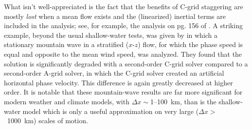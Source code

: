 \documentclass[10pt,letterpaper,margin=1in]{memoir}
\begin{document}
What isn't well-appreciated is the fact that the benefits of C-grid staggering are mostly \textit{lost} when a mean flow exists and the (linearized) inertial terms are included in the analysis; see, for example, the analysis on pg. 156 of \citet{durran2010numerical}. A striking example, beyond the usual shallow-water tests, was given by \citet{Reinecke2009} in which a stationary mountain wave in a stratified ($x$-$z$) flow, for which the phase speed is equal and opposite to the mean wind speed, was analyzed. They found that the solution is significantly degraded with a second-order C-grid solver compared to a second-order A-grid solver, in which the C-grid solver created an artificial horizontal phase velocity. This difference is again greatly decreased at higher order. It is notable that these mountain-wave results are far more significant for modern weather and climate models, with $\Delta x \sim$1--100~km, than is the shallow-water model which is only a useful approximation on very large ($\Delta x >$~1000~km) scales of motion.
\end{document}
